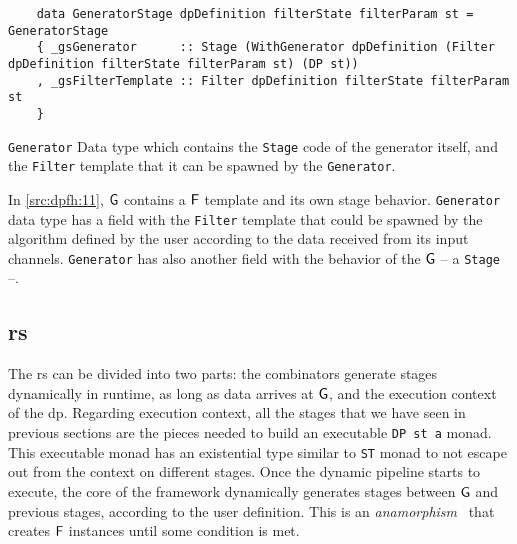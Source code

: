 \begin{listing}[htp!]
  \begin{verbatim}
    data GeneratorStage dpDefinition filterState filterParam st = GeneratorStage
    { _gsGenerator      :: Stage (WithGenerator dpDefinition (Filter dpDefinition filterState filterParam st) (DP st))
    , _gsFilterTemplate :: Filter dpDefinition filterState filterParam st
    }  
  \end{verbatim}
  \caption[{[\texttt{Stage.hs}] Generator}]{\texttt{Generator} Data type which contains the \texttt{Stage} code of the generator itself, and the \texttt{Filter} template that it can be spawned by the \texttt{Generator}.}
  \label{src:dpfh:11}
\end{listing}

In \autoref{src:dpfh:11}, $\mathsf{G}$ contains a $\mathsf{F}$ template and its own stage behavior.
\texttt{Generator} data type has a field with the \texttt{Filter} template that could be spawned by the algorithm defined by the user according to the data received from its input channels.
\texttt{Generator} has also another field with the behavior of the $\mathsf{G}$ -- a \texttt{Stage} --. 

\subsection{\acrfull{rs}}
The \acrshort{rs} can be divided into two parts: the combinators generate stages dynamically in runtime, as long as data arrives at $\mathsf{G}$,
and the execution context of the \acrshort{dp}.
Regarding execution context, all the stages that we have seen in previous sections are the pieces needed to build an executable \texttt{DP st a} monad.
This executable monad has an existential type similar to \texttt{ST} monad to not escape out from the context on different stages.
Once the dynamic pipeline starts to execute, the core of the framework dynamically generates stages between $\mathsf{G}$ and previous stages, according to the user definition. 
This is an \emph{anamorphism}~\cite{lenses} that creates $\mathsf{F}$ instances until some condition is met.

